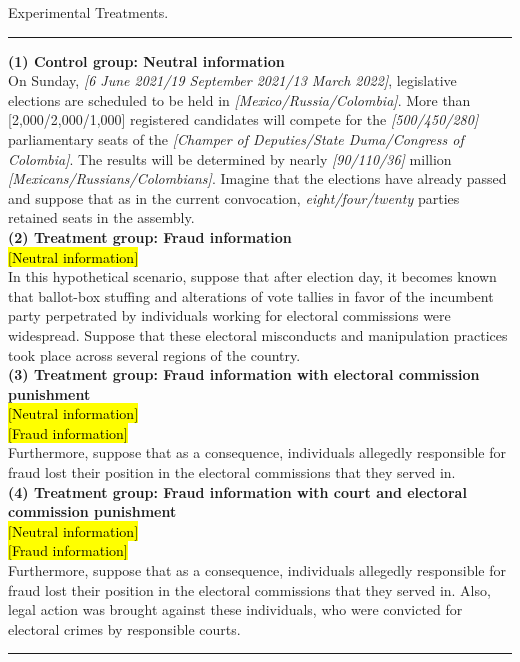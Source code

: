 \documentclass[11pt, ngerman,english,a4]{article}
\begin{document}
\singlespacing
\begin{table}[H]
	\caption{Experimental Treatments.}
	\label{tab:treatments}
	
	\hrule 
	\vspace{0.5cm}
	\textbf{(1) Control group: Neutral information} \\
	On Sunday, \textit{[6 June 2021/19 September 2021/13 March 2022]}, legislative elections are scheduled to be held in \textit{[Mexico/Russia/Colombia]}. 
	More than [2,000/2,000/1,000] registered candidates will compete for the \textit{[500/450/280]} parliamentary seats of the \textit{[Champer of Deputies/State Duma/Congress of Colombia]}. 
	The results will be determined by nearly \textit{[90/110/36]} million \textit{[Mexicans/Russians/Colombians]}.
	Imagine that the elections have already passed and suppose that as in the current convocation, \textit{eight/four/twenty} parties retained seats in the assembly. \\
	
	\textbf{(2) Treatment group: Fraud information} \\
	\hl{$[$Neutral information$]$} \\
	In this hypothetical scenario, suppose that after election day, it becomes known that ballot-box stuffing and alterations of vote tallies in favor of the incumbent party perpetrated by individuals working for electoral commissions were widespread. 
	Suppose that these electoral misconducts and manipulation practices took place across several regions of the country. \\
	
	
	\textbf{(3) Treatment group: Fraud information with electoral commission punishment} \\ 
	\hl{$[$Neutral information$]$} \\
	\hl{$[$Fraud information$]$} \\
	Furthermore, suppose that as a consequence, individuals allegedly responsible for fraud lost their position in the electoral commissions that they served in.\\
	
	\textbf{(4) Treatment group: Fraud information with court and electoral commission punishment} \\
	\hl{$[$Neutral information$]$} \\
	\hl{$[$Fraud information$]$} \\
	Furthermore, suppose that as a consequence, individuals allegedly responsible for fraud lost their position in the electoral commissions that they served in. 
	Also, legal action was brought against these individuals, who were convicted for electoral crimes by responsible courts.
	\vspace{0.5cm}
	\hrule
\end{table}
\end{document}
